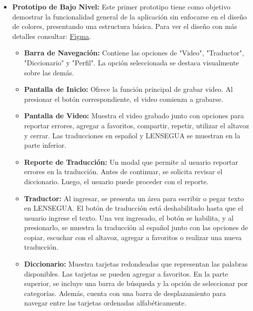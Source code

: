 \begin{itemize}

    \item \textbf{Prototipo de Bajo Nivel:} Este primer prototipo tiene como objetivo demostrar la funcionalidad general de la aplicación sin enfocarse en el diseño de colores, presentando una estructura básica. Para ver el diseño con más detalles consultar: \href{https://www.figma.com/design/d7NOw36r1mUY7qDBIveJ2K/Se%C3%B1as-Chapinas?node-id=45-820&node-type=SECTION&t=luJsnsyUNaEJGP24-0}{Figma}.


    \begin{itemize}
        \item \textbf{Barra de Navegación:} Contiene las opciones de "Video", "Traductor", "Diccionario" y "Perfil". La opción seleccionada se destaca visualmente sobre las demás.
        
        \item \textbf{Pantalla de Inicio:} Ofrece la función principal de grabar video. Al presionar el botón correspondiente, el video comienza a grabarse.
        
        \item \textbf{Pantalla de Video:} Muestra el video grabado junto con opciones para reportar errores, agregar a favoritos, compartir, repetir, utilizar el altavoz y cerrar. Las traducciones en español y LENSEGUA se muestran en la parte inferior.
        
        \item \textbf{Reporte de Traducción:} Un modal que permite al usuario reportar errores en la traducción. Antes de continuar, se solicita revisar el diccionario. Luego, el usuario puede proceder con el reporte.
        
        \item \textbf{Traductor:} Al ingresar, se presenta un área para escribir o pegar texto en LENSEGUA. El botón de traducción está deshabilitado hasta que el usuario ingrese el texto. Una vez ingresado, el botón se habilita, y al presionarlo, se muestra la traducción al español junto con las opciones de copiar, escuchar con el altavoz, agregar a favoritos o realizar una nueva traducción.
        
        \item \textbf{Diccionario:} Muestra tarjetas redondeadas que representan las palabras disponibles. Las tarjetas se pueden agregar a favoritos. En la parte superior, se incluye una barra de búsqueda y la opción de seleccionar por categorías. Además, cuenta con una barra de desplazamiento para navegar entre las tarjetas ordenadas alfabéticamente.
        

\end{itemize}
\end{itemize}
